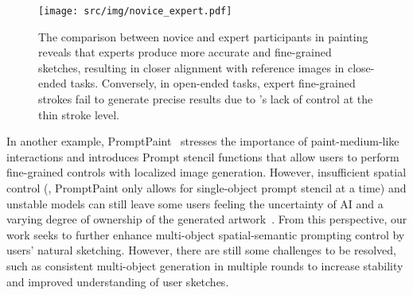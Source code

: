 \begin{figure*}[t]
    \centering
    \texttt{[image: src/img/novice\_expert.pdf]}
    \vspace{-2mm}
    \caption{The comparison between novice and expert participants in painting reveals that experts produce more accurate and fine-grained sketches, resulting in closer alignment with reference images in close-ended tasks. Conversely, in open-ended tasks, expert fine-grained strokes fail to generate precise results due to \tool's lack of control at the thin stroke level.}
    \label{fig:novice_expert}
\end{figure*}


In another example, PromptPaint~\cite{promptpaint} stresses the importance of paint-medium-like interactions and introduces Prompt stencil functions that allow users to perform fine-grained controls with localized image generation. 
However, insufficient spatial control (\eg, PromptPaint only allows for single-object prompt stencil at a time) and unstable models can still leave some users feeling the uncertainty of AI and a varying degree of ownership of the generated artwork~\cite{promptpaint}.
From this perspective, our work seeks to further enhance multi-object spatial-semantic prompting control by users' natural sketching.
However, there are still some challenges to be resolved, such as consistent multi-object generation in multiple rounds to increase stability and improved understanding of user sketches.   


